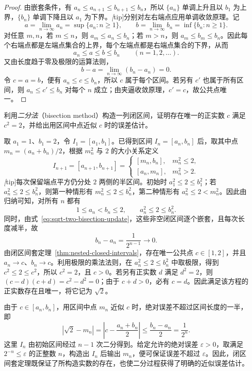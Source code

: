 \begin{proof}
由嵌套条件，有 $a_n\leq a_{n+1}\leq b_{n+1}\leq b_n$，所以 $\{a_n\}$ 单调上升且以 $b_1$ 为上界，$\{b_n\}$ 单调下降且以 $a_1$ 为下界。\emph[tip]{分别对左右端点应用单调收敛原理。}记
\[
    a=\lim_{n\to\infty}a_n=\sup\{a_n:n\geq1\},
    \qquad
    b=\lim_{n\to\infty}b_n=\inf\{b_n:n\geq1\}.
\]
对任意 $m,n$，若 $m\leq n$，则 $a_m\leq a_n\leq b_n$；若 $m>n$，则 $a_m\leq b_m\leq b_n$。因此每个右端点都是左端点集合的上界，每个左端点都是右端点集合的下界，从而
\[
    a_n\leq a\leq b\leq b_n\qquad(n=1,2,\ldots).
\]
又由长度趋于零及极限的运算法则，
\[
    b-a=\lim_{n\to\infty}(b_n-a_n)=0.
\]
令 $c=a=b$，便有 $a_n\leq c\leq b_n$，所以 $c$ 属于每个区间。若另有 $c'$ 也属于所有区间，则 $a_n\leq c'\leq b_n$ 对每个 $n$ 成立；由夹逼收敛原理，$c'=c$，故公共点唯一。
\end{proof}

\begin{example}
\label{ex:sqrt-two-bisection}
利用\emph{二分法}（bisection method）构造一列闭区间，证明存在唯一的正实数 $c$ 满足 $c^2=2$，并给出用区间中点近似 $c$ 时的误差估计。
\end{example}

\begin{solve}
取 $a_1=1$、$b_1=2$，令 $I_1=[a_1,b_1]$。已得到区间 $I_n=[a_n,b_n]$ 后，取其中点 $m_n=(a_n+b_n)/2$，根据 $m_n^2$ 与 $2$ 的大小关系定义
\begin{equation}
    I_{n+1}=[a_{n+1},b_{n+1}]=
    \begin{cases}
        [m_n,b_n], & m_n^2\leq2,\\
        [a_n,m_n], & m_n^2>2.
    \end{cases}
    \label{eq:sqrt-two-bisection-update}
\end{equation}
\emph[tip]{每次保留端点平方仍分处 $2$ 两侧的半区间。}初始时 $a_1^2\leq2\leq b_1^2$；若 $a_n^2\leq2\leq b_n^2$，则第一种情形有 $m_n^2\leq2\leq b_n^2$，第二种情形有 $a_n^2\leq2<m_n^2$。因此由归纳可知，对所有 $n$ 都有
\[
    1\leq a_n<b_n\leq2,
    \qquad a_n^2\leq2\leq b_n^2.
\]
同时，由式~\eqref{eq:sqrt-two-bisection-update}，这些非空闭区间逐个嵌套，且每次长度减半，故
\[
    b_n-a_n=\frac{1}{2^{n-1}}\longrightarrow0.
\]
由闭区间套定理~\ref{thm:nested-closed-intervals}，存在唯一公共点 $c\in[1,2]$，并且 $a_n\to c$、$b_n\to c$。利用极限的乘法法则，在 $a_n^2\leq2\leq b_n^2$ 中取极限，得到 $c^2\leq2\leq c^2$，所以 $c^2=2$，且 $c>0$。若另有正实数 $d$ 满足 $d^2=2$，则 $(c-d)(c+d)=c^2-d^2=0$；由于 $c+d>0$，必有 $c=d$。因此满足该方程的正实数存在且唯一，将它记为 $\sqrt2$。

由于 $c\in[a_n,b_n]$，用区间中点 $m_n$ 近似 $c$ 时，绝对误差不超过区间长度的一半，即
\begin{equation}
    \left|\sqrt2-m_n\right|
    =\left|c-\frac{a_n+b_n}{2}\right|
    \leq\frac{b_n-a_n}{2}
    =\frac1{2^n}.
    \label{eq:sqrt-two-bisection-error}
\end{equation}
这里 $I_n$ 由初始区间经过 $n-1$ 次二分得到。给定允许的绝对误差 $\varepsilon>0$，取满足 $2^{-n}\leq\varepsilon$ 的正整数 $n$，构造出 $I_n$ 后输出 $m_n$，便可保证误差不超过 $\varepsilon$。因此，闭区间套定理既保证了所构造实数的存在，也使二分过程获得了明确的近似误差估计。
\end{solve}

